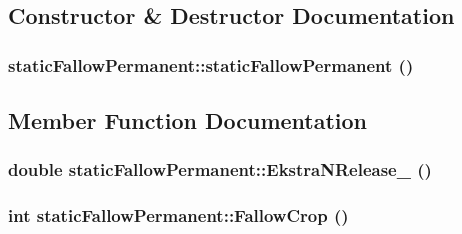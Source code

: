 \subsection{Constructor \& Destructor Documentation}
\hypertarget{classstatic_fallow_permanent_a37c636b6122edf4a79407b75fb54cf9e}{
\subsubsection[{staticFallowPermanent}]{\setlength{\rightskip}{0pt plus 5cm}staticFallowPermanent::staticFallowPermanent ()}}
\label{classstatic_fallow_permanent_a37c636b6122edf4a79407b75fb54cf9e}


\subsection{Member Function Documentation}
\hypertarget{classstatic_fallow_permanent_abc13fb0b45757da417588021c2770357}{
\subsubsection[{EkstraNRelease\_\-}]{\setlength{\rightskip}{0pt plus 5cm}double staticFallowPermanent::EkstraNRelease\_\- ()}}
\label{classstatic_fallow_permanent_abc13fb0b45757da417588021c2770357}
\hypertarget{classstatic_fallow_permanent_aa5f6b0e6960c0c3cf2c3c235e772d7f6}{
\subsubsection[{FallowCrop}]{\setlength{\rightskip}{0pt plus 5cm}int staticFallowPermanent::FallowCrop ()}}
\label{classstatic_fallow_permanent_aa5f6b0e6960c0c3cf2c3c235e772d7f6}


